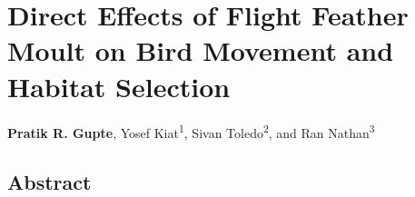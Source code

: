 \chapter{Direct Effects of Flight Feather Moult on Bird Movement and Habitat Selection}\label{ch:holeybirds}

{\noindent \sffamily\textbf{Pratik R. Gupte}, Yosef Kiat\textsuperscript{1}, Sivan Toledo\textsuperscript{2}, and Ran Nathan\textsuperscript{3}}


\section*{Abstract}



